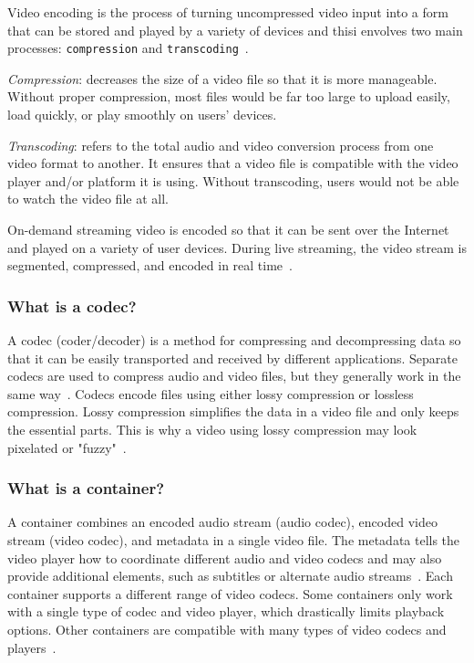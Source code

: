 Video encoding is the process of turning uncompressed video input into a form that can be stored and played by a variety of devices and thisi envolves two main processes: \texttt{compression} and \texttt{transcoding}~\cite{video-encoding}.
%
\begin{item-c}
\item \emph{Compression}: decreases the size of a video file so that it is more manageable. Without proper compression, most files would be far too large to upload easily, load quickly, or play smoothly on users' devices.
\item \emph{Transcoding}: refers to the total audio and video conversion process from one video format to another. It ensures that a video file is compatible with the video player and/or platform it is using. Without transcoding, users would not be able to watch the video file at all.
\end{item-c}

On-demand streaming video is encoded so that it can be sent over the Internet and played on a variety of user devices. During live streaming, the video stream is segmented, compressed, and encoded in real time~\cite{video-encoding}.

\subsubsection{What is a codec?}
A codec (coder/decoder) is a method for compressing and decompressing data so that it can be easily transported and received by different applications. Separate codecs are used to compress audio and video files, but they generally work in the same way~\cite{video-encoding}.
Codecs encode files using either lossy compression or lossless compression. Lossy compression simplifies the data in a video file and only keeps the essential parts. This is why a video using lossy compression may look pixelated or "fuzzy"~\cite{video-encoding}. 

\subsubsection{What is a container?}
A container combines an encoded audio stream (audio codec), encoded video stream (video codec), and metadata in a single video file. The metadata tells the video player how to coordinate different audio and video codecs and may also provide additional elements, such as subtitles or alternate audio streams~\cite{video-encoding}.
Each container supports a different range of video codecs. Some containers only work with a single type of codec and video player, which drastically limits playback options. Other containers are compatible with many types of video codecs and players~\cite{video-encoding}.

